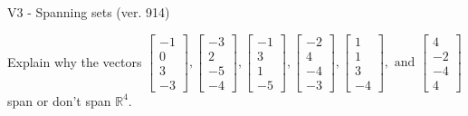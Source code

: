 \begin{exercise}
  \begin{exerciseTitle}V3 - Spanning sets (ver. 914)\end{exerciseTitle}
  \begin{exerciseStatement}
    Explain why the vectors \(\left[\begin{array}{r}
-1 \\
0 \\
3 \\
-3
\end{array}\right] , \left[\begin{array}{r}
-3 \\
2 \\
-5 \\
-4
\end{array}\right] , \left[\begin{array}{r}
-1 \\
3 \\
1 \\
-5
\end{array}\right] , \left[\begin{array}{r}
-2 \\
4 \\
-4 \\
-3
\end{array}\right] , \left[\begin{array}{r}
1 \\
1 \\
3 \\
-4
\end{array}\right] , \text{ and } \left[\begin{array}{r}
4 \\
-2 \\
-4 \\
4
\end{array}\right]\) span or don't span \(\mathbb{R}^4\). 
	



\end{exerciseStatement}
\end{exercise}
